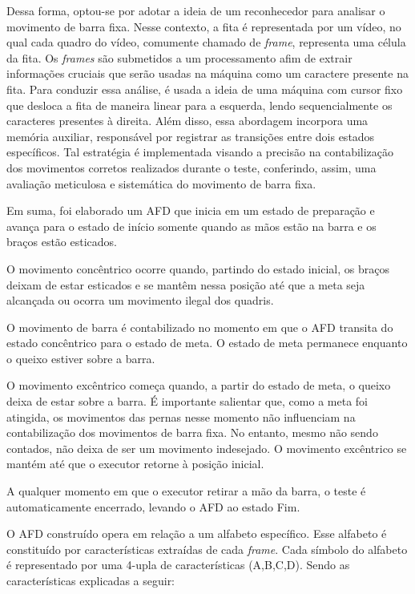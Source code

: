 Dessa forma, optou-se por adotar a ideia de um reconhecedor para analisar o movimento de barra fixa. Nesse contexto, a fita é representada por um vídeo, no qual cada quadro do vídeo, comumente chamado de \textit{frame}, representa uma célula da fita. Os \textit{frames} são submetidos a um processamento afim de extrair informações cruciais que serão usadas na máquina como um caractere presente na fita. Para conduzir essa análise, é usada a ideia de uma máquina com cursor fixo que desloca a fita de maneira linear para a esquerda, lendo sequencialmente os caracteres presentes à direita. Além disso, essa abordagem incorpora uma memória auxiliar, responsável por registrar as transições entre dois estados específicos. Tal estratégia é implementada visando a precisão na contabilização dos movimentos corretos realizados durante o teste, conferindo, assim, uma avaliação meticulosa e sistemática do movimento de barra fixa.

Em suma, foi elaborado um \ac{AFD} que inicia em um estado de preparação e avança para o estado de início somente quando as mãos estão na barra e os braços estão esticados.

O movimento concêntrico ocorre quando, partindo do estado inicial, os braços deixam de estar esticados e se mantêm nessa posição até que a meta seja alcançada ou ocorra um movimento ilegal dos quadris.

O movimento de barra é contabilizado no momento em que o \ac{AFD} transita do estado concêntrico para o estado de meta. O estado de meta permanece enquanto o queixo estiver sobre a barra.

O movimento excêntrico começa quando, a partir do estado de meta, o queixo deixa de estar sobre a barra. É importante salientar que, como a meta foi atingida, os movimentos das pernas nesse momento não influenciam na contabilização dos movimentos de barra fixa. No entanto, mesmo não sendo contados, não deixa de ser um movimento indesejado. O movimento excêntrico se mantém até que o executor retorne à posição inicial.

A qualquer momento em que o executor retirar a mão da barra, o teste é automaticamente encerrado, levando o \ac{AFD} ao estado Fim.

O \ac{AFD} construído opera em relação a um alfabeto específico. Esse alfabeto é constituído por características extraídas de cada \textit{frame}. Cada símbolo do alfabeto é representado por uma 4-upla de características (A,B,C,D). Sendo as características explicadas a seguir:

